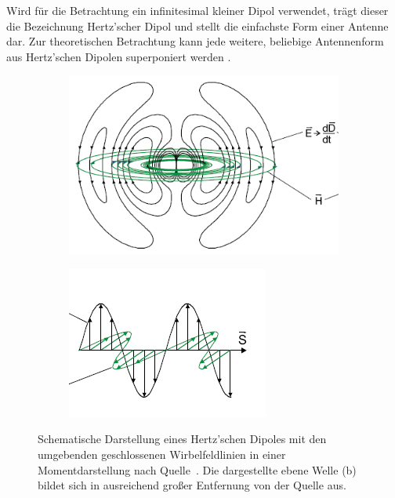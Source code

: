 \par
\vspace{\linespace}
Wird für die Betrachtung ein infinitesimal kleiner Dipol verwendet, trägt dieser die Bezeichnung Hertz'scher Dipol und stellt die einfachste Form einer Antenne dar. Zur theoretischen Betrachtung kann jede weitere, beliebige Antennenform aus Hertz'schen Dipolen superponiert werden \cite{EM_Schirmung}.
\par
\vspace{\linespace}
\begin{figure}
    \centering
    \begin{subfigure}[c]{0.4\textwidth}
        \includegraphics[width=\textwidth]{Abbildungen/Kapitel2/Hertz'scher_Dipol_A.png}
        \caption{}\label{subfig:2_Hertzscher_Dipol_A}
    \end{subfigure}
    \hspace{1cm}
    \begin{subfigure}[c]{0.4\textwidth}
        \includegraphics[width=\textwidth]{Abbildungen/Kapitel2/Hertz'scher_Dipol_B.png}
        \caption{}\label{subfig:2_Hertzscher_Dipol_B}
    \end{subfigure}
    \caption{Schematische Darstellung eines Hertz'schen Dipoles mit den umgebenden geschlossenen Wirbelfeldlinien in einer Momentdarstellung nach Quelle~\cite{EM_Schirmung}. Die dargestellte ebene Welle (b) bildet sich in ausreichend großer Entfernung von der Quelle aus.}
    \label{fig:2_Hertzscher_Dipol}
\end{figure}


